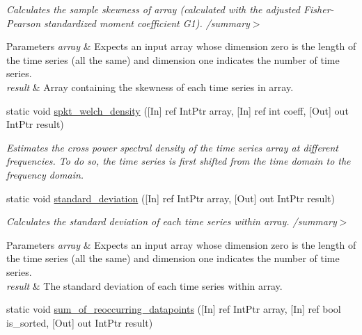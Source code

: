 \begin{DoxyCompactItemize}
\begin{DoxyCompactList}\small\item\em Calculates the sample skewness of array (calculated with the adjusted Fisher-\/\+Pearson standardized moment coefficient G1). /summary$>$ 
\begin{DoxyParams}{Parameters}
{\em array} & Expects an input array whose dimension zero is the length of the time series (all the same) and dimension one indicates the number of time series.\\
\hline
{\em result} & Array containing the skewness of each time series in array.\\
\hline
\end{DoxyParams}
\end{DoxyCompactList}\item 
static void \mbox{\hyperlink{classkhiva_1_1interop_1_1_d_l_l_features_aa81ee009b068590d2d685bcaa3cdf4a9}{spkt\+\_\+welch\+\_\+density}} (\mbox{[}In\mbox{]} ref Int\+Ptr array, \mbox{[}In\mbox{]} ref int coeff, \mbox{[}Out\mbox{]} out Int\+Ptr result)
\begin{DoxyCompactList}\small\item\em Estimates the cross power spectral density of the time series array at different frequencies. To do so, the time series is first shifted from the time domain to the frequency domain. \end{DoxyCompactList}\item 
static void \mbox{\hyperlink{classkhiva_1_1interop_1_1_d_l_l_features_a7e2fde4593b08431f573d93e6c2e1679}{standard\+\_\+deviation}} (\mbox{[}In\mbox{]} ref Int\+Ptr array, \mbox{[}Out\mbox{]} out Int\+Ptr result)
\begin{DoxyCompactList}\small\item\em Calculates the standard deviation of each time series within array. /summary$>$ 
\begin{DoxyParams}{Parameters}
{\em array} & Expects an input array whose dimension zero is the length of the time series (all the same) and dimension one indicates the number of time series.\\
\hline
{\em result} & The standard deviation of each time series within array.\\
\hline
\end{DoxyParams}
\end{DoxyCompactList}\item 
static void \mbox{\hyperlink{classkhiva_1_1interop_1_1_d_l_l_features_a79e38f9cb8b354c0f554f7754bb5e169}{sum\+\_\+of\+\_\+reoccurring\+\_\+datapoints}} (\mbox{[}In\mbox{]} ref Int\+Ptr array, \mbox{[}In\mbox{]} ref bool is\+\_\+sorted, \mbox{[}Out\mbox{]} out Int\+Ptr result)

\end{DoxyCompactItemize}
